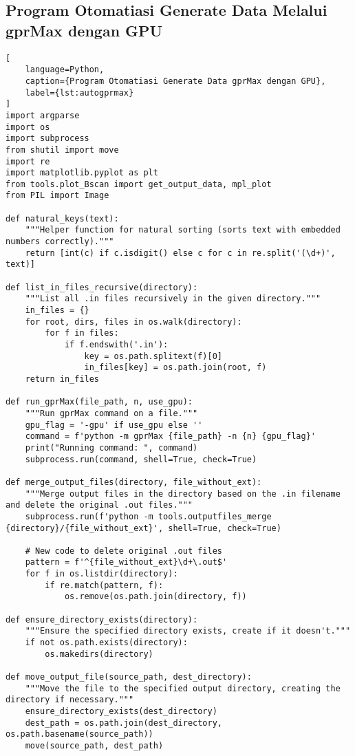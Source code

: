 \subsection*{Program Otomatiasi Generate Data Melalui gprMax dengan GPU}
\begin{lstlisting}[
    language=Python,
    caption={Program Otomatiasi Generate Data gprMax dengan GPU},
    label={lst:autogprmax}
]
import argparse
import os
import subprocess
from shutil import move
import re
import matplotlib.pyplot as plt
from tools.plot_Bscan import get_output_data, mpl_plot
from PIL import Image

def natural_keys(text):
    """Helper function for natural sorting (sorts text with embedded numbers correctly)."""
    return [int(c) if c.isdigit() else c for c in re.split('(\d+)', text)]

def list_in_files_recursive(directory):
    """List all .in files recursively in the given directory."""
    in_files = {}
    for root, dirs, files in os.walk(directory):
        for f in files:
            if f.endswith('.in'):
                key = os.path.splitext(f)[0]
                in_files[key] = os.path.join(root, f)
    return in_files

def run_gprMax(file_path, n, use_gpu):
    """Run gprMax command on a file."""
    gpu_flag = '-gpu' if use_gpu else ''
    command = f'python -m gprMax {file_path} -n {n} {gpu_flag}'
    print("Running command: ", command)
    subprocess.run(command, shell=True, check=True)

def merge_output_files(directory, file_without_ext):
    """Merge output files in the directory based on the .in filename and delete the original .out files."""
    subprocess.run(f'python -m tools.outputfiles_merge {directory}/{file_without_ext}', shell=True, check=True)
    
    # New code to delete original .out files
    pattern = f'^{file_without_ext}\d+\.out$'
    for f in os.listdir(directory):
        if re.match(pattern, f):
            os.remove(os.path.join(directory, f))

def ensure_directory_exists(directory):
    """Ensure the specified directory exists, create if it doesn't."""
    if not os.path.exists(directory):
        os.makedirs(directory)

def move_output_file(source_path, dest_directory):
    """Move the file to the specified output directory, creating the directory if necessary."""
    ensure_directory_exists(dest_directory)
    dest_path = os.path.join(dest_directory, os.path.basename(source_path))
    move(source_path, dest_path)


\end{lstlisting}
